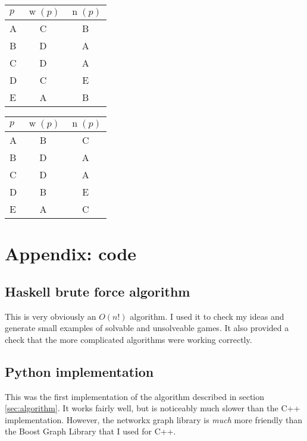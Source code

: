 \documentclass[12pt,x11names, rgb]{article}
\DeclareMathOperator{\w}{w}
\DeclareMathOperator{\n}{n}
\begin{document}
    \begin{multicols}{2}
        \begin{tabular}{l | c | c}
             $p$ & $\w(p)$ & $\n(p)$ \\
             \hline
             A &  C& B\\
             B &  D& A\\
             C &  D& A\\
             D &  C& E\\
             E &  A& B\\
        \end{tabular}


        \columnbreak
        \begin{tabular}{l | c | c}
             $p$ & $\w(p)$ & $\n(p)$ \\
             \hline
             A &  B& C\\
             B &  D& A\\
             C &  D& A\\
             D &  B& E\\
             E &  A& C\\
        \end{tabular}
    \end{multicols}


\section{Appendix: code}
    \renewcommand{\ttdefault}{pcr}
    \subsection{Haskell brute force algorithm}
        This is very obviously an $O(n!)$ algorithm. I used it to check my ideas and generate small examples of solvable and unsolveable games. It also provided a check that the more complicated algorithms were working correctly.
        
    \subsection{Python implementation}
        This was the first implementation of the algorithm described in section \ref{sec:algorithm}. It works fairly well, but is noticeably much slower than the C++ implementation. However, the networkx graph library is \emph{much} more friendly than the Boost Graph Library that I used for C++.
        
\end{document}
